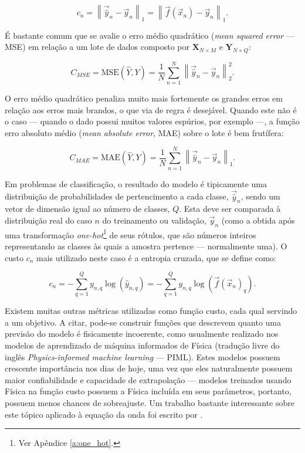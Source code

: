     \begin{equation} \label{e:c_ae_n}
      c_n =
      \left\| \vec{\hat{y}}_n - \vec{y}_n \right\|_1 =
      \left\| \vec{f}(\vec{x}_n) - \vec{y}_n \right\|_1
      .
    \end{equation}

    É bastante comum que se avalie o erro médio quadrático (\textit{mean squared error} --- MSE) em relação a um lote de dados composto por $\boldsymbol{X}_{N\times M}$ e $\boldsymbol{Y}_{N\times Q}$:

    \begin{equation} \label{e:c_mse}
      C_{MSE} =
      \text{MSE}\left(\hat{Y}, Y\right) =
      \frac{1}{N} \sum \limits_{n=1}^N \left\| \vec{\hat{y}}_n - \vec{y}_n \right\|_2^2
      .
    \end{equation}

    O erro médio quadrático penaliza muito mais fortemente os grandes erros em relação aos erros mais brandos, o que via de regra é desejável. Quando este não é o caso --- quando o dado possui muitos valores espúrios, por exemplo ---, a função erro absoluto médio (\textit{mean absolute error}, MAE) sobre o lote é bem frutífera:

    \begin{equation} \label{e:c_mae_n}
      C_{MAE} =
      \text{MAE}\left(\hat{Y}, Y\right) =
      \frac{1}{N} \sum \limits_{n=1}^N \left\| \vec{\hat{y}}_n - \vec{y}_n \right\|_1
      .
    \end{equation}

    Em problemas de classificação, o resultado do modelo é tipicamente uma distribuição de probabilidades de pertencimento a cada classe, $\vec{\hat{y}}_n$, sendo um vetor de dimensão igual ao número de classes, $Q$. Esta deve ser comparada à distribuição real do caso $n$ do treinamento ou validação, $\vec{y}_n$ (como a obtida após uma transformação \textit{one-hot}\footnote{Ver Apêndice \ref{a:one_hot}.} de seus rótulos, que são números inteiros representando as classes às quais a amostra pertence --- normalmente uma). O custo $c_n$ mais utilizado neste caso é a entropia cruzada, que se define como:

    \begin{equation} \label{e:c_xentropy_n}
      c_n = -\sum \limits_{q=1}^{Q} y_{n,q} \log({\hat{y}_{n,q}}) = -\sum \limits_{q=1}^{Q} y_{n,q} \log({\vec{f}(\vec{x}_n)_q})
      .
    \end{equation}

    Existem muitas outras métricas utilizadas como função custo, cada qual servindo a um objetivo. A citar, pode-se construir funções que descrevem quanto uma previsão do modelo é fisicamente incoerente, como usualmente realizado nos modelos de aprendizado de máquina informados de Física (tradução livre do inglês \textit{Physics-informed machine learning} --- PIML). Estes modelos possuem crescente importância nos dias de hoje, uma vez que eles naturalmente possuem maior confiabilidade e capacidade de extrapolação --- modelos treinados usando Física na função custo possuem a Física incluída em seus parâmetros, portanto, possuem menos chances de sobreajuste. Um trabalho bastante interessante sobre este tópico aplicado à equação da onda foi escrito por .

